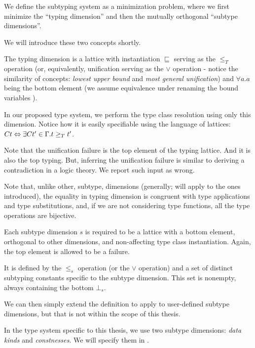 \begin{defn}
    We define the subtyping system as a minimization problem, where we first minimize the ``typing dimension'' and then the mutually orthogonal ``subtype dimensions''.

    We will introduce these two concepts shortly.
\end{defn}


\begin{defn}
    \label{typing_def}
    The typing dimension is a lattice with instantiation $\sqsubseteq$ serving as the $\leq_T$ operation (or, equivalently, unification serving as the $\lor$ operation - notice the similarity of concepts: \emph{lowest upper bound} and \emph{most general unification}) and $\forall a . a$ being the bottom element (we assume equivalence under renaming the bound variables ).

    In our proposed type system, we perform the type class resolution using only this dimension. Notice how it is easily specifiable using the language of lattices: $C t \Leftrightarrow \exists C t' \in \Gamma . t \geq_T t'$.
\end{defn}

\begin{remark}
    Note that the unification failure is the top element of the typing lattice. And it is also the top typing. But, inferring the unification failure is similar to deriving a contradiction in a logic theory. We report such input as wrong.
\end{remark}

\begin{remark}
    Note that, unlike other, subtype, dimensions (generally; will apply to the ones introduced), the equality in typing dimension is congruent with type applications and type substitutions, and, if we are not considering type functions, all the type operations are bijective.
\end{remark}

\begin{defn}
    Each subtype dimension $s$ is required to be a lattice with a bottom element, orthogonal to other dimensions, and non-affecting type class instantiation. Again, the top element is allowed to be a failure.

    It is defined by the $\leq_s$ operation (or the $\lor$ operation) and a set of distinct subtyping constants specific to the subtype dimension. This set is nonempty, always containing the bottom $\bot_s$.

    We can then simply extend the definition to apply to user-defined subtype dimensions, but that is not within the scope of this thesis.

    In the type system specific to this thesis, we use two subtype dimensions: \emph{data kinds} and \emph{constnesses}. We will specify them in .
\end{defn}



